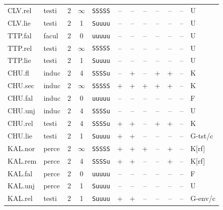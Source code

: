 {\begin{longtable}{@{}llcccccccccl@{}}
CLV.rel & testi & 2 & $\infty$ & \texttt{SSSSS} & \textsf{--} & \textsf{--} & \textsf{--} & \textsf{--} & \textsf{--} & -- & U \\
CLV.lie & testi & 2 & 1 & \texttt{Suuuu} & \textsf{--} & \textsf{--} & \textsf{--} & \textsf{--} & \textsf{--} & -- & U \\
TTP.fal & facul & 2 & 0 & \texttt{uuuuu} & \textsf{--} & \textsf{--} & \textsf{--} & \textsf{--} & \textsf{--} & -- & U \\
TTP.rel & testi & 2 & $\infty$ & \texttt{SSSSS} & \textsf{--} & \textsf{--} & \textsf{--} & \textsf{--} & \textsf{--} & -- & U \\
TTP.lie & testi & 2 & 1 & \texttt{Suuuu} & \textsf{--} & \textsf{--} & \textsf{--} & \textsf{--} & \textsf{--} & -- & U \\
CHU.fl & induc & 2 & 4 & \texttt{SSSSu} & \textsf{--} & \textsf{+} & \textsf{--} & \textsf{+} & \textsf{+} & -- & K \\
CHU.sec & induc & 2 & $\infty$ & \texttt{SSSSS} & \textsf{+} & \textsf{+} & \textsf{+} & \textsf{+} & \textsf{+} & -- & K \\
CHU.fal & induc & 2 & 0 & \texttt{uuuuu} & \textsf{--} & \textsf{--} & \textsf{--} & \textsf{--} & \textsf{--} & -- & F \\
CHU.unj & induc & 2 & 4 & \texttt{SSSSu} & \textsf{--} & \textsf{--} & \textsf{--} & \textsf{--} & \textsf{--} & -- & U \\
CHU.rel & testi & 2 & 4 & \texttt{SSSSu} & \textsf{+} & \textsf{+} & \textsf{--} & \textsf{+} & \textsf{+} & -- & K \\
CHU.lie & testi & 2 & 1 & \texttt{Suuuu} & \textsf{+} & \textsf{+} & \textsf{--} & \textsf{--} & \textsf{--} & -- & G-tst/c \\
KAL.nor & perce & 2 & $\infty$ & \texttt{SSSSS} & \textsf{+} & \textsf{+} & \textsf{+} & \textsf{--} & \textsf{+} & -- & K[rf] \\
KAL.rem & perce & 2 & 4 & \texttt{SSSSu} & \textsf{+} & \textsf{+} & \textsf{--} & \textsf{--} & \textsf{+} & -- & K[rf] \\
KAL.fal & perce & 2 & 0 & \texttt{uuuuu} & \textsf{--} & \textsf{--} & \textsf{--} & \textsf{--} & \textsf{--} & -- & F \\
KAL.unj & perce & 2 & 1 & \texttt{Suuuu} & \textsf{--} & \textsf{--} & \textsf{--} & \textsf{--} & \textsf{--} & -- & U \\
KAL.rel & testi & 2 & 1 & \texttt{Suuuu} & \textsf{+} & \textsf{+} & \textsf{--} & \textsf{--} & \textsf{--} & -- & G-env/c \\

\end{longtable}}
